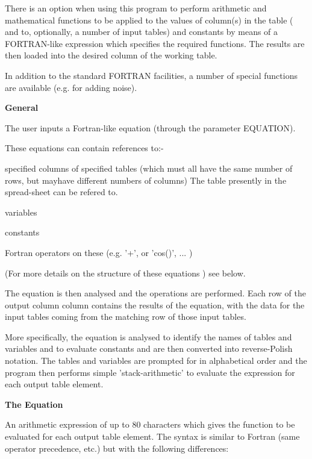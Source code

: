 \begin{small}
{{ There is an option when using this program to perform arithmetic
 and mathematical functions to be applied to the values of column(s) in
 the table ( and to, optionally, a number of input tables) and
 constants by means of a FORTRAN-like expression which specifies the
 required functions. The results are then loaded into the desired
 column of the working table.
 
 In addition to the standard FORTRAN facilities, a number of special
 functions are available (e.g. for adding noise).
 
  {\bf \large General}
 
 The user inputs a Fortran-like equation (through the parameter
 EQUATION).
 
 These equations can contain references to:-
 
  \begin{list}{{-}}{}
   \item specified columns of specified tables (which must all have the
        same number of rows, but mayhave different numbers of columns)
        The table presently in the spread-sheet can be refered to.
   \item variables
   \item constants
   \item Fortran operators on these (e.g. '+', or 'cos()', ... )
   \end{list}
 
 (For more details on the structure of these equations ) see below.
 
 The equation is then analysed and the operations are performed.
 Each row of the output column column contains the results of the
 equation, with the data for the input tables coming from the matching
 row of those input tables.
 
 More specifically, the equation is analysed to identify the names
 of tables and variables and to evaluate constants and are then
 converted into reverse-Polish notation. The tables and variables are
 prompted for in alphabetical order and the program then performs
 simple 'stack-arithmetic' to evaluate the expression for each output
 table element.
 
 {\bf \large The Equation}
 
 An arithmetic expression of up to 80 characters which gives the
 function to be evaluated for each output table element. The syntax
 is similar to Fortran (same operator precedence, etc.) but with the
 following differences:
 
 \begin{enumerate}


\end{enumerate}}}
\end{small}
